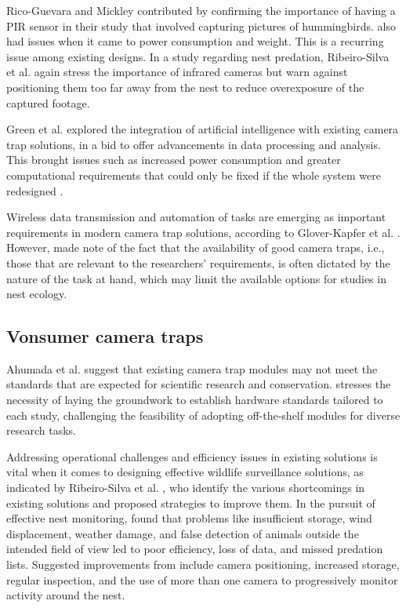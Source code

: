 \documentclass[class=report,11pt,crop=false]{standalone}
\begin{document}
Rico-Guevara and Mickley \cite{rico-guevara2017bring} contributed by confirming the importance of having a PIR sensor in their study that involved capturing pictures of hummingbirds. \cite{rico-guevara2017bring} also had issues when it came to power consumption and weight. This is a recurring issue among existing designs. In a study regarding nest predation, Ribeiro-Silva et al. \cite{ribeiro-silva2018testing} again stress the importance of infrared cameras but warn against positioning them too far away from the nest to reduce overexposure of the captured footage.

Green et al. \cite{green2020innovations} explored the integration of artificial intelligence with existing camera trap solutions, in a bid to offer advancements in data processing and analysis. This brought issues such as increased power consumption and greater computational requirements that could only be fixed if the whole system were redesigned \cite{green2020innovations}. 

Wireless data transmission and automation of tasks are emerging as important requirements in modern camera trap solutions, according to Glover-Kapfer et al. \cite{glover2019camera}. However, \cite{glover2019camera} made note of the fact that the availability of good camera traps, i.e., those that are relevant to the researchers’ requirements, is often dictated by the nature of the task at hand, which may limit the available options for studies in nest ecology.  

\subsection{Vonsumer camera traps}

Ahumada et al. \cite{ahumada2020wildlife} suggest that existing camera trap modules may not meet the standards that are expected for scientific research and conservation. \cite{ahumada2020wildlife} stresses the necessity of laying the groundwork to establish hardware standards tailored to each study, challenging the feasibility of adopting off-the-shelf modules for diverse research tasks. 

Addressing operational challenges and efficiency issues in existing solutions is vital when it comes to designing effective wildlife surveillance solutions, as indicated by Ribeiro-Silva  et al. \cite{ribeiro-silva2018testing}, who identify the various shortcomings in existing solutions and proposed strategies to improve them. In the pursuit of effective nest monitoring, \cite{ribeiro-silva2018testing} found that problems like insufficient storage, wind displacement, weather damage, and false detection of animals outside the intended field of view led to poor efficiency, loss of data, and missed predation lists. Suggested improvements from \cite{ribeiro-silva2018testing} include camera positioning, increased storage, regular inspection, and the use of more than one camera to progressively monitor activity around the nest. 
\end{document}
